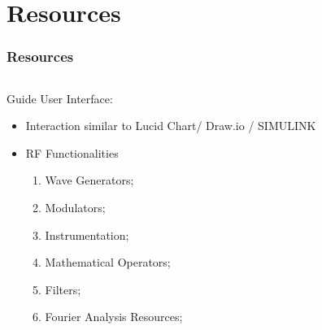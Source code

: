 \section{Resources}
\begin{frame}
	\frametitle{Resources}
    
\begin{columns}
        \begin{column}{0.5\textwidth}
       Guide User Interface: \small
     \begin{itemize}
    \item Interaction similar to Lucid Chart/ Draw.io / SIMULINK
    
         \item RF Functionalities
     \begin{enumerate}
     \item Wave Generators;
    \item Modulators;
    \item Instrumentation;
    \item Mathematical Operators;
    \item Filters;
    \item Fourier Analysis Resources;
    \end{enumerate}
     \end{itemize}
     
        \end{column}
        

\end{columns}
\end{frame}
